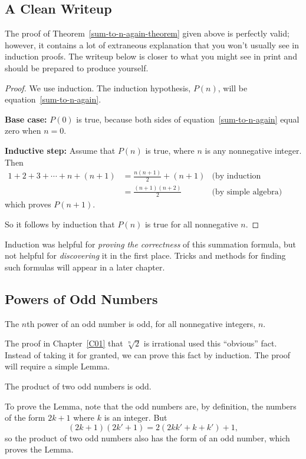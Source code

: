 \subsection{A Clean Writeup}

The proof of Theorem~\ref{sum-to-n-again-theorem} given above is perfectly
valid; however, it contains a lot of extraneous explanation that you won't
usually see in induction proofs.  The writeup below is closer to what you
might see in print and should be prepared to produce yourself.

\begin{proof}
We use induction.  The induction hypothesis, $P(n)$, will be
equation~\eqref{sum-to-n-again}.

\textbf{Base case:} $P(0)$ is true, because both sides of
equation~\eqref{sum-to-n-again} equal zero when $n=0$.

\textbf{Inductive step:} Assume that $P(n)$ is true, where
$n$ is any nonnegative integer.  Then
\begin{align*}
1 + 2 + 3 + \cdots + n + (n+1)
    & = \frac{n(n+1)}{2} + (n+1) & \text{(by induction hypothesis)}\\
    & = \frac{(n+1)(n+2)}{2}  & \text{(by simple algebra)}
\end{align*}
which proves $P(n+1)$.

So it follows by induction that $P(n)$ is true for all nonnegative $n$.
\end{proof}

Induction was helpful for \emph{proving the correctness} of this
summation formula, but not helpful for \emph{discovering} it in the
first place.   Tricks and methods for finding such formulas will appear in
a later chapter.

\iffalse
\subsection{Powers of Odd Numbers}

\begin{fact*}
The $n$th power of an odd number is odd, for all nonnegative integers, $n$.
\end{fact*}
The proof in Chapter~\ref{C01} that $\sqrt[n]{2}$ is irrational used this 
``obvious'' fact.  Instead of taking it for granted, we can prove this fact
by induction.
The proof will require a simple Lemma.
\begin{lemma*}
The product of two odd numbers is odd.
\end{lemma*}
To prove the Lemma, note that the odd numbers are, by definition, the
numbers of the form $2k+1$ where $k$ is an integer.  But
\[
(2k+1)(2k'+1) = 2(2kk' + k + k')+1,
\]
so the product of two odd numbers also has the form of an odd number,
which proves the Lemma.

